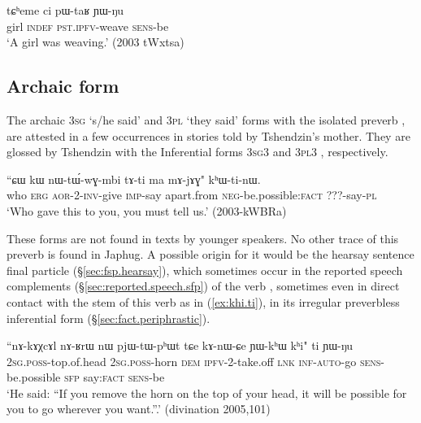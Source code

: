 \begin{exe}
\ex \label{ex:pWtaR.YWNu}
\gll tɕʰeme ci pɯ-taʁ ɲɯ-ŋu \\
girl \textsc{indef} \textsc{pst}.\textsc{ipfv}-weave \textsc{sens}-be \\
\glt `A girl was weaving.' (2003 tWxtsa)
\end{exe}

\subsection{Archaic form} \label{sec:khWti}
The archaic \textsc{3sg}  `s/he said' and \textsc{3pl}  `they said' forms with the isolated preverb , are attested in a few occurrences in stories told by Tshendzin's mother. They are glossed by Tshendzin with the Inferential forms \textsc{3sg}\fl{}3  and \textsc{3pl}\fl{}3 , respectively. 

\begin{exe}
\ex \label{ex:khWtinW}
\gll ``ɕɯ kɯ nɯ-tɯ́-wɣ-mbi tɤ-ti ma mɤ-jɤɣ" kʰɯ-ti-nɯ. \\
who \textsc{erg} \textsc{aor}-2-\textsc{inv}-give \textsc{imp}-say apart.from \textsc{neg}-be.possible:\textsc{fact} ???-say-\textsc{pl} \\
\glt `Who gave this to you, you must tell us.' (2003-kWBRa)
\end{exe}

These forms are not found in texts by younger speakers. No other trace of this preverb is found in Japhug. A possible origin for it would be the hearsay sentence final particle  (§\ref{sec:fsp.hearsay}), which sometimes occur in the reported speech complements (§\ref{sec:reported.speech.sfp}) of the verb , sometimes even in direct contact with the stem of this verb as in (\ref{ex:khi.ti}), in its irregular preverbless inferential form (§\ref{sec:fact.periphrastic}).

\begin{exe}
\ex \label{ex:khi.ti}
 \gll ``nɤ-kɤχcɤl nɤ-ʁrɯ nɯ pjɯ-tɯ-pʰɯt tɕe kɤ-nɯ-ɕe ɲɯ-kʰɯ kʰi" ti ɲɯ-ŋu\\
 \textsc{2sg}.\textsc{poss}-top.of.head \textsc{2sg}.\textsc{poss}-horn \textsc{dem} \textsc{ipfv}-2-take.off \textsc{lnk} \textsc{inf}-\textsc{auto}-go \textsc{sens}-be.possible \textsc{sfp} say:\textsc{fact} \textsc{sens}-be \\
 \glt `He said: ``If you remove the horn on the top of your head, it will be possible for you to go wherever you want.''.' (divination 2005,101)
\end{exe}

